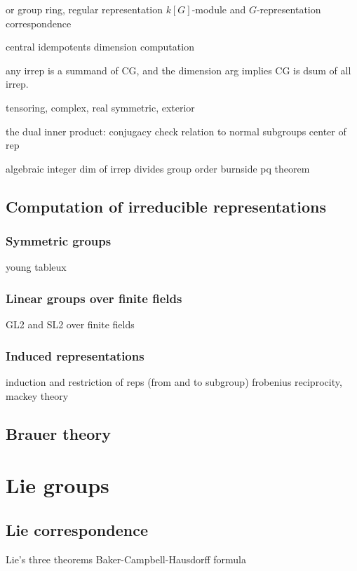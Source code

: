 \documentclass{../note}
\begin{document}
\begin{prb}
or group ring,
regular representation
$k[G]$-module and $G$-representation correspondence
\end{prb}

\begin{prb}
central idempotents
dimension computation
\end{prb}
any irrep is a summand of CG, and the dimension arg implies CG is dsum of all irrep.




tensoring, complex, real
symmetric, exterior




the dual inner product: conjugacy check
relation to normal subgroups
center of rep




algebraic integer
dim of irrep divides group order
burnside pq theorem


\chapter{Computation of irreducible representations}
\section{Symmetric groups}
young tableux

\section{Linear groups over finite fields}
GL2 and SL2 over finite fields

\section{Induced representations}
induction and restriction of reps (from and to subgroup)
frobenius reciprocity, mackey theory



\chapter{Brauer theory}




\part{Lie groups}
\chapter{Lie correspondence}
Lie's three theorems
Baker-Campbell-Hausdorff formula
\end{document}
